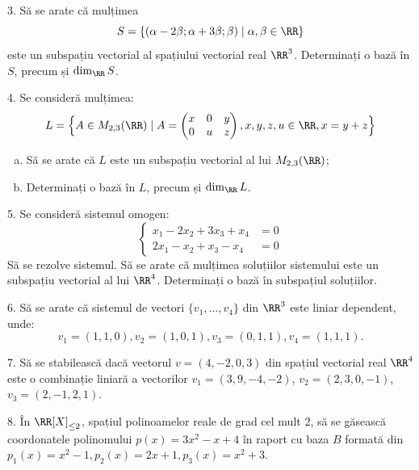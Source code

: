 \vspace{1cm}

3. Să se arate că mulțimea
\[
  S = \{(\alpha - 2 \beta; \alpha + 3 \beta; \beta) \mid \alpha, \beta \in \RR \}
\]
este un subspațiu vectorial al spațiului vectorial real $\RR^3$. Determinați
o bază în $S$, precum și $\dim_\RR S$.

\vspace{1cm}

4. Se consideră mulțimea:
\[
  L = \Big\{ A \in M_{2,3}(\RR) \mid %
  A = \begin{pmatrix}
    x & 0 & y \\
    0 & u & z
  \end{pmatrix}, x, y, z, u \in \RR, x = y + z \Big\}
\]
\begin{enumerate}[(a)]
\item Să se arate că $L$ este un subspațiu vectorial al lui $M_{2,3}(\RR)$;
\item Determinați o bază în $L$, precum și $\dim_\RR L$.
\end{enumerate}

\vspace{1cm}

5. Se consideră sistemul omogen:
\[
  \begin{cases}
    x_1 - 2x_2 + 3x_3 + x_4 &= 0 \\
    2x_1 - x_2 + x_3 - x_4 &= 0
  \end{cases}
\]
Să se rezolve sistemul. Să se arate că mulțimea soluțiilor sistemului este un
subspațiu vectorial al lui $\RR^4$. Determinați o bază în subspațiul soluțiilor.

\vspace{1cm}

6. Să se arate că sistemul de vectori $\{ v_1, \dots, v_4 \}$ din $\RR^3$ este
liniar dependent, unde:
\[
  v_1 = (1, 1, 0), v_2 = (1, 0, 1), v_3 = (0, 1, 1), v_4 = (1, 1, 1).
\]

\vspace{1cm}

7. Să se stabilească dacă vectorul $v = (4, -2, 0, 3)$ din spațiul vectorial
real $\RR^4$ este o combinație liniară a vectorilor $v_1 = (3, 9, -4, -2)$,
$v_2 = (2, 3, 0, -1)$, $v_3 = (2, -1, 2, 1)$.

\vspace{1cm}

8. În $\RR[X]_{\leq 2}$, spațiul polinoamelor reale de grad cel mult 2,
să se găsească coordonatele polinomului $p(x) = 3x^2 - x + 4$ în raport
cu baza $B$ formată din $p_1(x) = x^2 - 1, p_2(x) = 2x + 1, p_3(x) = x^2 + 3$.

